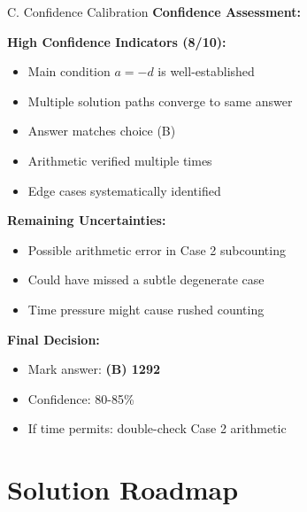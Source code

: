 \documentclass[12pt]{article}
\begin{document}
\begin{verificationbox}{C. Confidence Calibration}
\textbf{Confidence Assessment:}

\textbf{High Confidence Indicators (8/10):}
\begin{itemize}
    \item Main condition $a=-d$ is well-established
    \item Multiple solution paths converge to same answer
    \item Answer matches choice (B)
    \item Arithmetic verified multiple times
    \item Edge cases systematically identified
\end{itemize}

\textbf{Remaining Uncertainties:}
\begin{itemize}
    \item Possible arithmetic error in Case 2 subcounting
    \item Could have missed a subtle degenerate case
    \item Time pressure might cause rushed counting
\end{itemize}

\textbf{Final Decision:}
\begin{itemize}
    \item Mark answer: \textbf{(B) 1292}
    \item Confidence: 80-85\%
    \item If time permits: double-check Case 2 arithmetic
\end{itemize}
\end{verificationbox}

\section{Solution Roadmap}
\end{document}
